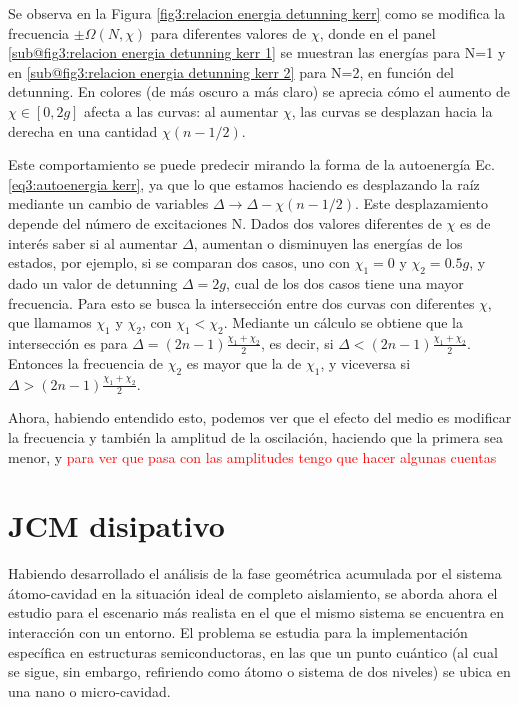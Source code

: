 Se observa en la Figura \ref{fig3:relacion energia detunning kerr} como se modifica la frecuencia $\pm \Omega(N,\chi)$ para diferentes valores de $\chi$, donde en el panel \ref{sub@fig3:relacion energia detunning kerr 1} se muestran las energías para N=1 y en \ref{sub@fig3:relacion energia detunning kerr 2} para N=2, en función del detunning. En colores (de más oscuro a más claro) se aprecia cómo el aumento de $\chi \in [0,2g]$ afecta a las curvas: al aumentar $\chi$, las curvas se desplazan hacia la derecha en una cantidad $\chi(n-1/2)$. 

Este comportamiento se puede predecir mirando la forma de la autoenergía Ec. \ref{eq3:autoenergia kerr}, ya que lo que estamos haciendo es desplazando la raíz mediante un cambio de variables $\Delta \rightarrow \Delta - \chi(n-1/2)$. Este desplazamiento depende del número de excitaciones N. 
Dados dos valores diferentes de $\chi$ es de interés saber si al aumentar $\Delta$, aumentan o disminuyen las energías de los estados, por ejemplo, si se comparan dos casos, uno con $\chi_1=0$ y $\chi_2=0.5g$, y dado un valor de detunning $\Delta=2g$, cual de los dos casos tiene una mayor frecuencia. Para esto se busca la intersección entre dos curvas con diferentes $\chi$, que llamamos $\chi_1$ y $\chi_2$, con $\chi_1<\chi_2$. Mediante un cálculo se obtiene que la intersección es para $\Delta=(2n-1)\frac{\chi_1+\chi_2}{2}$, es decir, si $\Delta<(2n-1)\frac{\chi_1+\chi_2}{2}$. Entonces la frecuencia de $\chi_2$ es mayor que la de $\chi_1$, y viceversa si $\Delta>(2n-1)\frac{\chi_1+\chi_2}{2}$.

Ahora, habiendo entendido esto, podemos ver que el efecto del medio es modificar la frecuencia y también la amplitud de la oscilación, haciendo que la primera sea menor, y \textcolor{red}{para ver que pasa con las amplitudes tengo que hacer algunas cuentas}


\section{JCM disipativo} 
\label{sec3:jcm disipativo}


Habiendo desarrollado el análisis de la fase geométrica acumulada por el sistema átomo-cavidad en la situación ideal de completo aislamiento, se aborda ahora el estudio para el escenario más realista en el que el mismo sistema se encuentra en interacción con un entorno. El problema se estudia para la implementación específica en estructuras semiconductoras, en las que un punto cuántico (al cual se sigue, sin embargo, refiriendo como átomo o sistema de dos niveles) se ubica en una nano o micro-cavidad.

